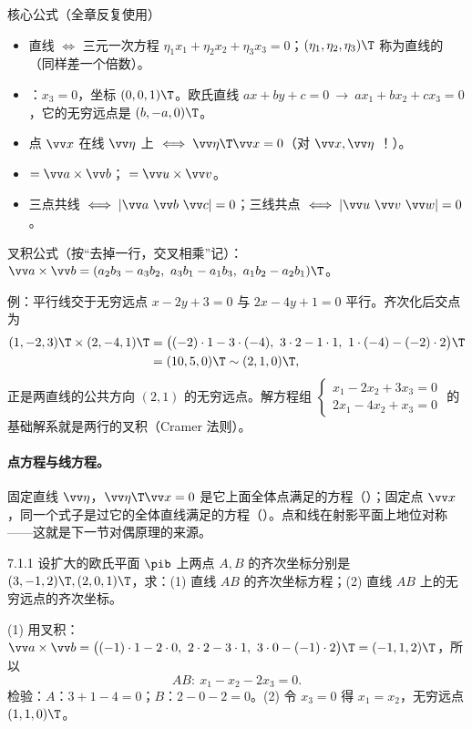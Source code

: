 \begin{thmbox}{核心公式（全章反复使用）}
\begin{itemize}
\item 直线 $\iff$ 三元一次方程 $\eta_1x_1+\eta_2x_2+\eta_3x_3=0$；$(\eta_1,\eta_2,\eta_3)\T$ 称为直线的（同样差一个倍数）。
\item {}：$x_3=0$，坐标 $(0,0,1)\T$。欧氏直线 $ax+by+c=0\ \to\ ax_1+bx_2+cx_3=0$，它的无穷远点是 $(b,-a,0)\T$。
\item 点 $\vv x$ 在线 $\vv\eta$ 上 $\iff \vv\eta\T\vv x=0$（对 $\vv x,\vv\eta$ ！）。
\item {} $=\vv a\times\vv b$； $=\vv u\times\vv v$。
\item 三点共线 $\iff|\vv a\ \vv b\ \vv c|=0$；三线共点 $\iff|\vv u\ \vv v\ \vv w|=0$。
\end{itemize}
\end{thmbox}

\noindent 叉积公式（按“去掉一行，交叉相乘”记）：$\vv a\times\vv b=(a_2b_3-a_3b_2,\ a_3b_1-a_1b_3,\ a_1b_2-a_2b_1)\T$。

\begin{mtbox}{例：平行线交于无穷远点}
$x-2y+3=0$ 与 $2x-4y+1=0$ 平行。齐次化后交点为
\begin{align*}
(1,-2,3)\T\times(2,-4,1)\T&=\big((-2)\cdot1-3\cdot(-4),\ 3\cdot2-1\cdot1,\ 1\cdot(-4)-(-2)\cdot2\big)\T\\
&=(10,5,0)\T\sim(2,1,0)\T,
\end{align*}
正是两直线的公共方向 $(2,1)$ 的无穷远点。\gd 解方程组 $\begin{cases}x_1-2x_2+3x_3=0\\2x_1-4x_2+x_3=0\end{cases}$ 的基础解系就是两行的叉积（Cramer 法则）。
\end{mtbox}

\paragraph{点方程与线方程。}固定直线 $\vv\eta$，$\vv\eta\T\vv x=0$ 是它上面全体点满足的方程（）；固定点 $\vv x$，同一个式子是过它的全体直线满足的方程（）。点和线在射影平面上地位对称——这就是下一节对偶原理的来源。


\begin{ex}{7.1.1}
设扩大的欧氏平面 $\pib$ 上两点 $A,B$ 的齐次坐标分别是 $(3,-1,2)\T,(2,0,1)\T$，求：(1) 直线 $AB$ 的齐次坐标方程；(2) 直线 $AB$ 上的无穷远点的齐次坐标。
\end{ex}
\jie (1) 用叉积：$\vv a\times\vv b=\big((-1)\cdot1-2\cdot0,\ 2\cdot2-3\cdot1,\ 3\cdot0-(-1)\cdot2\big)\T=(-1,1,2)\T$，所以
\[
AB:\ x_1-x_2-2x_3=0 .
\]
检验：$A$：$3+1-4=0$；$B$：$2-0-2=0$。\quad(2) 令 $x_3=0$ 得 $x_1=x_2$，无穷远点 $(1,1,0)\T$。

